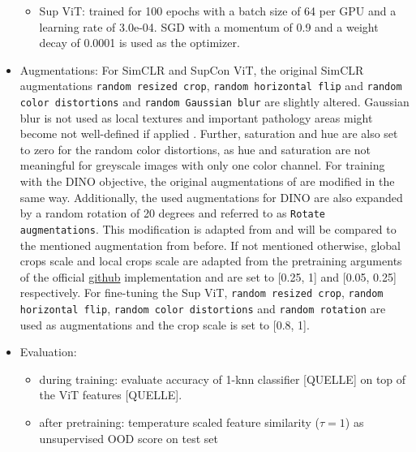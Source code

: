 \begin{itemize}
		\begin{itemize}
			\item Sup ViT: trained for 100 epochs with a batch size of 64 per GPU and a learning rate of 3.0e-04. SGD with a momentum of 0.9 and a weight decay of 0.0001 is used as the optimizer.
		\end{itemize}
			\item Augmentations: For SimCLR and SupCon ViT, the original SimCLR augmentations \texttt{random resized crop}, \texttt{random horizontal flip} and \texttt{random color distortions}
			and \texttt{random Gaussian blur} are slightly altered.
			Gaussian blur is not used as local textures and important pathology areas might become not well-defined if applied \citep{Azizi2021}.
			Further, saturation and hue are also set to zero for the random color distortions, as hue and saturation are not meaningful for greyscale images with only one color channel. 
			For training with the DINO objective, the original augmentations of \citep{Caron2021} are modified in the same way.
			Additionally, the used augmentations for DINO are also expanded by a random rotation of 20 degrees and referred to as \texttt{Rotate augmentations}. 
			This modification is adapted from \citep{Azizi2021} and will be compared to the mentioned augmentation from before.
			If not mentioned otherwise, global crops scale and local crops scale are adapted from the pretraining arguments of the official \href{https://github.com/facebookresearch/dino#pretrained-models}{github} implementation and are set to [0.25, 1] and [0.05, 0.25] respectively. 
			For fine-tuning the Sup ViT, \texttt{random resized crop}, \texttt{random horizontal flip}, \texttt{random color distortions} and \texttt{random rotation} are used as augmentations and the crop scale is set to [0.8, 1].
	\item Evaluation: 
	\begin{itemize}
		\item during training: evaluate accuracy of 1-knn classifier [QUELLE] on top of the ViT features [QUELLE].
	\end{itemize}
	\begin{itemize}
		\item after pretraining: temperature scaled feature similarity ($\tau=1$) as unsupervised OOD score on test set

\end{itemize}
\end{itemize}
